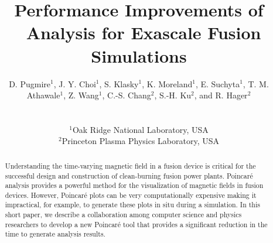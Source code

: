 \documentclass{egpubl}
\title {Performance Improvements of \poincare\ Analysis for Exascale Fusion Simulations}
\author[D. Pugmire et al.]
{\parbox{\textwidth}
{
\centering 
D. Pugmire$^{1}$\orcid{0000-0003-0647-2634},
J. Y. Choi$^{1}$\orcid{0000-0002-6459-6152},
S. Klasky$^{1}$\orcid{0000-0003-3559-5772},
K. Moreland$^{1}$\orcid{0000-0002-7051-3288},
E. Suchyta$^{1}$\orcid{0000-0002-7047-9358},
T. M. Athawale$^{1}$\orcid{0000-0003-3163-6274},
Z. Wang$^{1}$\orcid{0000-0003-1123-9925},
C.-S. Chang$^{2}$\orcid{0000-0002-3346-5731},
S.-H. Ku$^{2}$\orcid{0000-0002-9964-1208}, and
R. Hager$^{2}$\orcid{0000-0002-4624-3150}
}
\\
{\parbox{\textwidth}{
\centering
$^1$Oak Ridge National Laboratory, USA\\
$^2$Princeton Plasma Physics Laboratory, USA
}
}
}
\newcommand{\poincare}{Poincar\'{e}\xspace}
\begin{document}

\maketitle
\begin{abstract}
Understanding the time-varying magnetic field in a fusion device is critical for the successful design and construction of clean-burning fusion power plants. \poincare analysis provides a powerful method for the visualization of magnetic fields in fusion devices. However, \poincare plots can be very computationally expensive making it impractical, for example, to generate these plots in situ during a simulation.
In this short paper, we describe a collaboration among computer science and physics researchers to develop a new \poincare tool that provides a significant reduction in the time to generate analysis results. \\

\end{abstract}
\end{document}
